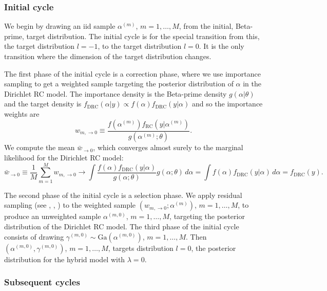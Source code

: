 \documentclass[11pt,letter]{article}
\newcommand{\DP}{Dirichlet RC model}
\begin{document}
\subsubsection{Initial cycle}\label{s:init}

We begin by drawing an iid sample $\alpha^{(m)}$, $m=1,\ldots,M$, from the initial, Beta-prime, target distribution.
The initial cycle is for the special transition from this, the target distribution $l=-1$, to the target distribution $l=0$.
It is the only transition where the dimension of the target distribution changes.

The first phase of the initial cycle is a correction phase, where we use importance sampling to get a weighted sample targeting the posterior distribution of $\alpha$ in the \DP{}.
The importance density is the Beta-prime density $g(\alpha|\theta)$ and the target density is $f_\mathrm{DRC}(\alpha|y) \propto f(\alpha)f_\mathrm{DRC}(y|\alpha)$ and so the importance weights are
\begin{equation}\label{e:initweights}
  w_{m,\to 0}
  \equiv \frac{f(\alpha^{(m)}) f_\mathrm{RC}(y|\alpha^{(m)})}{g(\alpha^{(m)};\theta)}.
\end{equation}
We compute the mean $\bar{w}_{\to 0}$, which converges almost surely to the marginal likelihood for the \DP{}:
\begin{equation}\label{e:initmarl}
  \bar{w}_{\to 0} \equiv \frac{1}{M} \sum_{m=1}^M w_{m,\to 0}
  \rightarrow
  \int \frac{f(\alpha) f_\mathrm{DRC}(y|\alpha)}{g(\alpha;\theta)} g(\alpha;\theta) \, d\alpha
  = \int f(\alpha) f_\mathrm{DRC}(y|\alpha) \, d\alpha = f_\mathrm{DRC}(y).
\end{equation}

The second phase of the initial cycle is a selection phase.
We apply residual sampling (see , , ) to the weighted sample $(w_{m,\to 0}; \alpha^{(m)})$, $m=1,\ldots,M$, to produce an unweighted sample $\alpha^{(m,0)}$, $m=1,\ldots,M$, targeting the posterior distribution of the \DP{}.
The third phase of the initial cycle consists of drawing $\gamma^{(m,0)} \sim \mathrm{Ga}(\alpha^{(m,0)})$, $m=1,\ldots,M$.
Then $(\alpha^{(m,0)}, \gamma^{(m,0)})$, $m=1,\ldots,M$, targets distribution $l=0$, the posterior distribution for the hybrid model with $\lambda = 0$.

\subsubsection{Subsequent cycles}\label{s:subseq}
\end{document}
